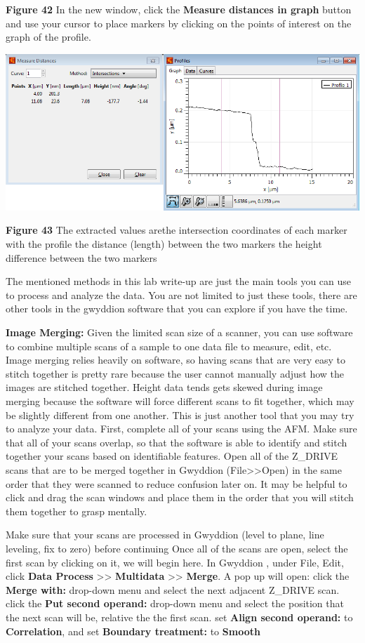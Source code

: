 \documentclass{../lab}
\begin{document}
\textbf{Figure 42}
In the new window, click the \textbf{Measure distances in graph} button  and use your cursor to place markers by clicking on the points of interest on the graph of the profile.

\begin{center}
    \href{http://experimentationlab.berkeley.edu/sites/default/files/AFMImages/51.png}{\includegraphics[width=0.5\linewidth]{images/51.png}}
\end{center}


\textbf{Figure 43}
The extracted values arethe intersection coordinates of each marker with the profile
the distance (length) between the two markers
the height difference between the two markers

The mentioned methods in this lab write-up are just the main tools you can use to process and analyze the data.  You are not limited to just these tools, there are other tools in the gwyddion software that you can explore if you have the time.

\textbf{Image Merging: }Given the limited scan size of a scanner, you can use software to combine multiple scans of a sample to one data file to measure, edit, etc.  Image merging relies heavily on software, so having scans that are very easy to stitch together is pretty rare because the user cannot manually adjust how the images are stitched together.  Height data tends gets skewed during image merging because the software will force different scans to fit together, which may be slightly different from one another.  This is just another tool that you may try to analyze your data.
First, complete all of your scans using the AFM.  Make sure that all of your scans overlap, so that the software is able to identify and stitch together your scans based on identifiable features.
Open all of the Z\_DRIVE scans that are to be merged together in Gwyddion (File>>Open) in the same order that they were scanned to reduce confusion later on.
It may be helpful to click and drag the scan windows and place them in the order that you will stitch them together to grasp mentally.

Make sure that your scans are processed in Gwyddion (level to plane, line leveling, fix to zero) before continuing
Once all of the scans are open, select the first scan by clicking on it, we will begin here.
In Gwyddion \textbf{}, under File, Edit, click \textbf{Data Process} >> \textbf{Multidata }>> \textbf{Merge}.
A pop up will open:
click the \textbf{Merge with:} drop-down menu and select the next adjacent Z\_DRIVE scan.
click the \textbf{Put second operand:} drop-down menu and select the position that the next scan will be, relative the the first scan.
set \textbf{Align second operand:} to \textbf{Correlation}, and set \textbf{Boundary treatment:} to \textbf{Smooth}
\end{document}
